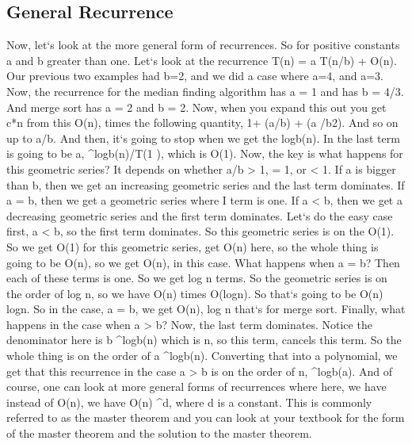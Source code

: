 \subsection{General Recurrence}
Now, let`s look at the more general form of recurrences.
So for positive constants a and b greater than one.
Let`s look at the recurrence T(n) = a T(n/b) + O(n).
Our previous two examples had b=2, and we did a case where a=4, and a=3.
Now, the recurrence for the median finding algorithm has a = 1 and has b = 4/3.
And merge sort has a = 2 and b = 2.
Now, when you expand this out you get c*n from this O(n), times the following quantity, 1+ (a/b) + (a /b2).
And so on up to a/b.
And then, it`s going to stop when we get the logb(n).
In the last term is going to be a, \textasciicircum{}logb(n)/T(1 ), which is O(1).
Now, the key is what happens for this geometric series? It depends on whether a/b \textgreater{} 1, = 1, or \textless{} 1.
If a is bigger than b, then we get an increasing geometric series and the last term dominates.
If a = b, then we get a geometric series where I term is one.
If a \textless{} b, then we get a decreasing geometric series and the first term dominates.
Let`s do the easy case first, a \textless{} b, so the first term dominates.
So this geometric series is on the O(1).
So we get O(1) for this geometric series, get O(n) here, so the whole thing is going to be O(n), so we get O(n), in this case.
What happens when a = b? Then each of these terms is one.
So we get log n terms.
So the geometric series is on the order of log n, so we have O(n) times O(logn).
So that`s going to be O(n) logn.
So in the case, a = b, we get O(n), log n that`s for merge sort.
Finally, what happens in the case when a \textgreater{} b? Now, the last term dominates.
Notice the denominator here is b \textasciicircum{}logb(n) which is n, so this term, cancels this term.
So the whole thing is on the order of a \textasciicircum{}logb(n).
Converting that into a polynomial, we get that this recurrence in the case a \textgreater{} b is on the order of n, \textasciicircum{}logb(a).
And of course, one can look at more general forms of recurrences where here, we have instead of O(n), we have O(n) \textasciicircum{}d, where d is a constant.
This is commonly referred to as the master theorem and you can look at your textbook for the form of the master theorem and the solution to the master theorem.

